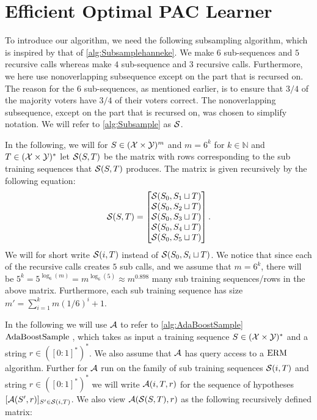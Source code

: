 \section{Efficient Optimal PAC Learner}\label{sec:optimalityah} 
To introduce our algorithm, we need the following subsampling algorithm, which is inspired by that of \cite{hannekeoptimal} \cref{alg:Subsamplehanneke}. We make $6$ sub-sequences and $ 5 $  recursive calls whereas \cite{hannekeoptimal} make $4$ sub-sequence and $ 3 $ recursive calls. Furthermore, we here use nonoverlapping subsequence except on the part that is recursed on. The reason for the $6$ sub-sequences, as mentioned earlier, is to ensure that $3/4$ of the majority voters have $3/4$ of their voters correct. The nonoverlapping subsequence, except on the part that is recursed on, was chosen to simplify notation. We will refer to \cref{alg:Subsample} as $\mathcal{S}$.


In the following, we will for $S\in (\mathcal{X}\times \mathcal{Y})^{m}$ and $m=6^{k}$ for $k\in\mathbb{N}$ and $T\in (\mathcal{X}\times \mathcal{Y})^{*}$ let $\mathcal{S}(S,T)$  be the matrix with rows corresponding to the sub training sequences that $\mathcal{S}(S,T)$ produces. The matrix is given recursively by the following equation:  
\begin{align*}
    \mathcal{S}(S,T)=
    \begin{bmatrix}
      \mathcal{S}(S_0,S_{1}\sqcup T)\\
      \mathcal{S}(S_0,S_{2}\sqcup T)\\
      \mathcal{S}(S_{0},S_{3}\sqcup T)\\
      \mathcal{S}(S_{0},S_{4}\sqcup T)\\
      \mathcal{S}(S_{0},S_{5}\sqcup T)
    \end{bmatrix}.
\end{align*}
We will for short write $\mathcal{S}(i,T)$ instead of $\mathcal{S}(S_{0},S_{i}\sqcup T)$. We notice that since each of the recursive calls creates $5$ sub calls, and we assume that $m=6^{k}$, there will be $5^{k}=5^{\log_{6}(m)}=m^{\log_{6}(5)}\approx m^{0.898}$ many sub training sequences/rows in the above matrix. Furthermore, each sub training sequence has size $ m'=\sum_{i=1}^{k} m(1/6)^{i}+1$. 


In the following we will use $\mathcal{A}$ to refer to \cref{alg:AdaBoostSample} $\text{AdaBoostSample }$, which takes as input a training sequence $ S\in(\mathcal{X}\times \mathcal{Y})^{*}$ and a string $ r\in ([0:1]^{*})^{*}$. We also assume that $ \mathcal{A} $ has query access to a $ \mathrm{ERM} $ algorithm.  
Further for $\mathcal{A}$ run on the family of sub training sequences $\mathcal{S}(i,T)$ and string $r\in ([0:1]^{*})^{*}$ we will write  $\mathcal{A}(i,T,r)$ for the sequence of hypotheses $[\mathcal{A}(S',r)]_{S'\in \mathcal{S}(i,T)}$. We also view $\mathcal{A}(\mathcal{S}(S,T),r)$ as the following recursively defined matrix:

